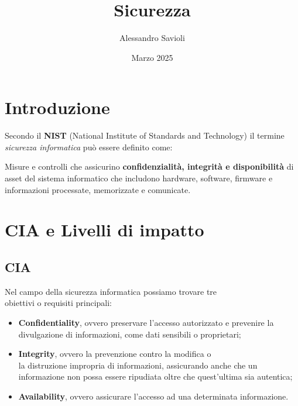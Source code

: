 \documentclass[14pt]{extarticle}
\begin{document}
\title{Sicurezza}
\author{Alessandro Savioli}
\date{Marzo 2025}

\maketitle

\tableofcontents

\newpage

\section{Introduzione}

Secondo il \textbf{NIST} (National Institute of Standards and Technology) il
termine \textit{sicurezza informatica} può essere definito come:

\begin{center}
    Misure e controlli che assicurino \textbf{confidenzialità, integrità e
    disponibilità} di asset del sistema informatico che includono hardware,
    software, firmware e informazioni processate, memorizzate e comunicate.
\end{center}

\section{CIA e Livelli di impatto}

\subsection{CIA}

Nel campo della sicurezza informatica possiamo trovare tre \\ obiettivi o
requisiti principali:

\begin{itemize}
    \item \textbf{Confidentiality}, ovvero preservare l'accesso autorizzato e
    prevenire la divulgazione di informazioni, come dati sensibili o
    proprietari;
    \item \textbf{Integrity}, ovvero la prevenzione contro la modifica o \\ la
    distruzione impropria di informazioni, assicurando anche che un informazione
    non possa essere ripudiata oltre che quest'ultima sia autentica;
    \item \textbf{Availability}, ovvero assicurare l'accesso ad una determinata
    informazione.  
\end{itemize}
\end{document}
